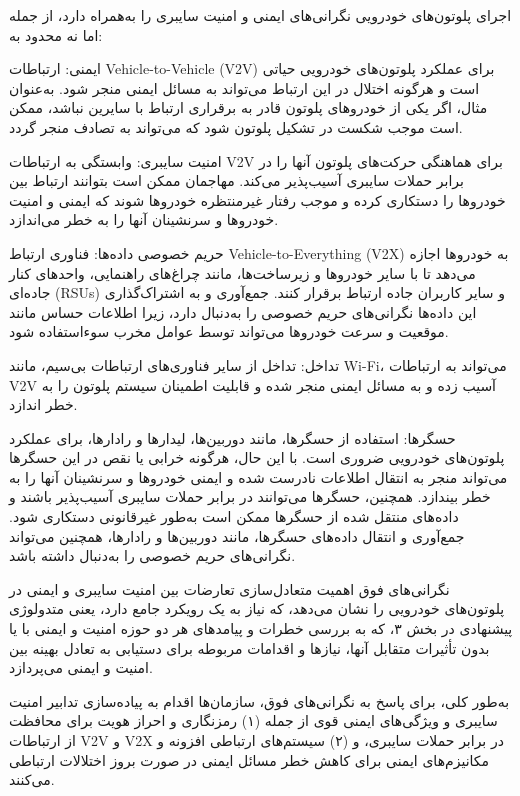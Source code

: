 \documentclass[a4paper,10pt]{article}
\begin{document}
            اجرای پلوتون‌های خودرویی نگرانی‌های ایمنی و امنیت سایبری را به‌همراه دارد، از جمله اما نه محدود به:

            ایمنی: ارتباطات Vehicle-to-Vehicle (V2V) برای عملکرد پلوتون‌های خودرویی حیاتی است و هرگونه اختلال در این ارتباط می‌تواند به مسائل ایمنی منجر شود. به‌عنوان مثال، اگر یکی از خودروهای پلوتون قادر به برقراری ارتباط با سایرین نباشد، ممکن است موجب شکست در تشکیل پلوتون شود که می‌تواند به تصادف منجر گردد.

            امنیت سایبری: وابستگی به ارتباطات V2V برای هماهنگی حرکت‌های پلوتون آنها را در برابر حملات سایبری آسیب‌پذیر می‌کند. مهاجمان ممکن است بتوانند ارتباط بین خودروها را دستکاری کرده و موجب رفتار غیرمنتظره خودروها شوند که ایمنی و امنیت خودروها و سرنشینان آنها را به خطر می‌اندازد.

            حریم خصوصی داده‌ها: فناوری ارتباط Vehicle-to-Everything (V2X) به خودروها اجازه می‌دهد تا با سایر خودروها و زیرساخت‌ها، مانند چراغ‌های راهنمایی، واحدهای کنار جاده‌ای (RSUs) و سایر کاربران جاده ارتباط برقرار کنند. جمع‌آوری و به اشتراک‌گذاری این داده‌ها نگرانی‌های حریم خصوصی را به‌دنبال دارد، زیرا اطلاعات حساس مانند موقعیت و سرعت خودروها می‌تواند توسط عوامل مخرب سوءاستفاده شود.

            تداخل: تداخل از سایر فناوری‌های ارتباطات بی‌سیم، مانند Wi-Fi، می‌تواند به ارتباطات V2V آسیب زده و به مسائل ایمنی منجر شده و قابلیت اطمینان سیستم پلوتون را به خطر اندازد.

            حسگرها: استفاده از حسگرها، مانند دوربین‌ها، لیدارها و رادارها، برای عملکرد پلوتون‌های خودرویی ضروری است. با این حال، هرگونه خرابی یا نقص در این حسگرها می‌تواند منجر به انتقال اطلاعات نادرست شده و ایمنی خودروها و سرنشینان آنها را به خطر بیندازد. همچنین، حسگرها می‌توانند در برابر حملات سایبری آسیب‌پذیر باشند و داده‌های منتقل شده از حسگرها ممکن است به‌طور غیرقانونی دستکاری شود. جمع‌آوری و انتقال داده‌های حسگرها، مانند دوربین‌ها و رادارها، همچنین می‌تواند نگرانی‌های حریم خصوصی را به‌دنبال داشته باشد.

            نگرانی‌های فوق اهمیت متعادل‌سازی تعارضات بین امنیت سایبری و ایمنی در پلوتون‌های خودرویی را نشان می‌دهد، که نیاز به یک رویکرد جامع دارد، یعنی متدولوژی پیشنهادی در بخش ۳، که به بررسی خطرات و پیامدهای هر دو حوزه امنیت و ایمنی با یا بدون تأثیرات متقابل آنها، نیازها و اقدامات مربوطه برای دستیابی به تعادل بهینه بین امنیت و ایمنی می‌پردازد.

            به‌طور کلی، برای پاسخ به نگرانی‌های فوق، سازمان‌ها اقدام به پیاده‌سازی تدابیر امنیت سایبری و ویژگی‌های ایمنی قوی از جمله (۱) رمزنگاری و احراز هویت برای محافظت از ارتباطات V2V و V2X در برابر حملات سایبری، و (۲) سیستم‌های ارتباطی افزونه و مکانیزم‌های ایمنی برای کاهش خطر مسائل ایمنی در صورت بروز اختلالات ارتباطی می‌کنند.
\end{document}

